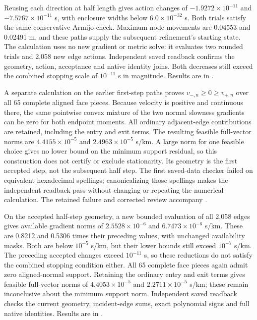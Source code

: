 Reusing each direction at half length gives action changes of
$-1.9272\times10^{-11}$ and $-7.5767\times10^{-11}$ s, with enclosure
widths below $6.0\times10^{-32}$ s. Both trials satisfy the same conservative
Armijo check. Maximum node movements are 0.04553 and 0.02491 m, and these
paths supply the subsequent refinement's starting state. The calculation uses no new
gradient or metric solve: it evaluates two rounded trials and 2,058 new
edge actions. Independent saved readback confirms the geometry, action,
acceptance and native identity joins. Both decreases still exceed the
combined stopping scale of $10^{-11}$ s in magnitude. Results are in
.

A separate calculation on the earlier first-step paths proves
$v_{-,n}\geq0\geq v_{+,n}$ over all 65 complete aligned face pieces.
Because velocity is positive and continuous there, the same pointwise
convex mixture of the two normal slowness gradients can be zero for both
endpoint moments. All ordinary adjacent-edge contributions are retained,
including the entry and exit terms. The resulting feasible full-vector
norms are $4.4155\times10^{-5}$ and $2.4963\times10^{-5}$ s/km. A large
norm for one feasible choice gives no lower bound on the minimum support
residual, so this construction does not certify or exclude stationarity.
Its geometry is the first accepted step, not the subsequent half step.
The first saved-data checker failed on equivalent hexadecimal spellings;
canonicalizing those spellings makes the independent readback pass without
changing or repeating the numerical calculation. The retained failure and
corrected review accompany
.

On the accepted half-step geometry, a new bounded evaluation of all 2,058
edges gives available gradient norms of $2.5528\times10^{-6}$ and
$6.7473\times10^{-6}$ s/km. These are 0.8212 and 0.5306 times their
preceding values, with unchanged availability masks. Both are below
$10^{-5}$ s/km, but their lower bounds still exceed $10^{-7}$ s/km.
The preceding accepted changes exceed $10^{-11}$ s, so these reductions
do not satisfy the combined stopping condition either. All 65 complete
face pieces again admit zero aligned-normal support. Retaining the
ordinary entry and exit terms gives feasible full-vector norms of
$4.4053\times10^{-5}$ and $2.2711\times10^{-5}$ s/km; these remain
inconclusive about the minimum support norm. Independent saved readback
checks the current geometry, incident-edge sums, exact polynomial signs
and full native identities. Results are in
.

